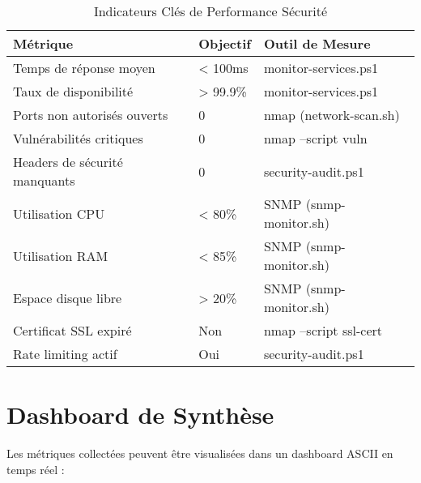 \documentclass[11pt,a4paper]{report}
\begin{document}
\begin{table}[H]
\centering
\caption{Indicateurs Clés de Performance Sécurité}
\label{tab:security_kpis}
\begin{tabular}{|p{5cm}|p{3cm}|p{5cm}|}
\hline
\textbf{Métrique} & \textbf{Objectif} & \textbf{Outil de Mesure} \\
\hline
Temps de réponse moyen & < 100ms & monitor-services.ps1 \\
\hline
Taux de disponibilité & > 99.9\% & monitor-services.ps1 \\
\hline
Ports non autorisés ouverts & 0 & nmap (network-scan.sh) \\
\hline
Vulnérabilités critiques & 0 & nmap --script vuln \\
\hline
Headers de sécurité manquants & 0 & security-audit.ps1 \\
\hline
Utilisation CPU & < 80\% & SNMP (snmp-monitor.sh) \\
\hline
Utilisation RAM & < 85\% & SNMP (snmp-monitor.sh) \\
\hline
Espace disque libre & > 20\% & SNMP (snmp-monitor.sh) \\
\hline
Certificat SSL expiré & Non & nmap --script ssl-cert \\
\hline
Rate limiting actif & Oui & security-audit.ps1 \\
\hline
\end{tabular}
\end{table}

\section{Dashboard de Synthèse}

Les métriques collectées peuvent être visualisées dans un dashboard ASCII en temps réel :
\end{document}
